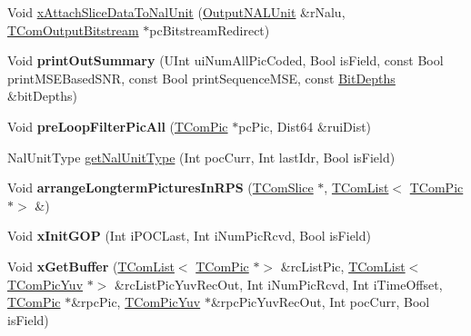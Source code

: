 \begin{DoxyCompactItemize}
\item 
Void \hyperlink{class_t_enc_g_o_p_a96ed3d41554e9b79bdb53902f136a28d}{x\+Attach\+Slice\+Data\+To\+Nal\+Unit} (\hyperlink{struct_output_n_a_l_unit}{Output\+N\+A\+L\+Unit} \&r\+Nalu, \hyperlink{class_t_com_output_bitstream}{T\+Com\+Output\+Bitstream} $\ast$pc\+Bitstream\+Redirect)
\item 
\mbox{\label{class_t_enc_g_o_p_a265e9dfc3f9d1f0e1ea66c9838496d2e}} 
Void {\bfseries print\+Out\+Summary} (U\+Int ui\+Num\+All\+Pic\+Coded, Bool is\+Field, const Bool print\+M\+S\+E\+Based\+S\+NR, const Bool print\+Sequence\+M\+SE, const \hyperlink{struct_bit_depths}{Bit\+Depths} \&bit\+Depths)
\item 
\mbox{\label{class_t_enc_g_o_p_a3de238965cb45d2418272b31b9124afc}} 
Void {\bfseries pre\+Loop\+Filter\+Pic\+All} (\hyperlink{class_t_com_pic}{T\+Com\+Pic} $\ast$pc\+Pic, Dist64 \&rui\+Dist)
\item 
Nal\+Unit\+Type \hyperlink{class_t_enc_g_o_p_a7bd2e40d2f134c13ed5db1bdeb3f115b}{get\+Nal\+Unit\+Type} (Int poc\+Curr, Int last\+Idr, Bool is\+Field)
\item 
\mbox{\label{class_t_enc_g_o_p_aa1263589751580350cd2c7722a377f4d}} 
Void {\bfseries arrange\+Longterm\+Pictures\+In\+R\+PS} (\hyperlink{class_t_com_slice}{T\+Com\+Slice} $\ast$, \hyperlink{class_t_com_list}{T\+Com\+List}$<$ \hyperlink{class_t_com_pic}{T\+Com\+Pic} $\ast$$>$ \&)
\item 
\mbox{\label{class_t_enc_g_o_p_aae6bcefeec5b4ce3fc6184e4a7664e2f}} 
Void {\bfseries x\+Init\+G\+OP} (Int i\+P\+O\+C\+Last, Int i\+Num\+Pic\+Rcvd, Bool is\+Field)
\item 
\mbox{\label{class_t_enc_g_o_p_a03b8814c81932aa44e08c6f8ae10a9f3}} 
Void {\bfseries x\+Get\+Buffer} (\hyperlink{class_t_com_list}{T\+Com\+List}$<$ \hyperlink{class_t_com_pic}{T\+Com\+Pic} $\ast$$>$ \&rc\+List\+Pic, \hyperlink{class_t_com_list}{T\+Com\+List}$<$ \hyperlink{class_t_com_pic_yuv}{T\+Com\+Pic\+Yuv} $\ast$$>$ \&rc\+List\+Pic\+Yuv\+Rec\+Out, Int i\+Num\+Pic\+Rcvd, Int i\+Time\+Offset, \hyperlink{class_t_com_pic}{T\+Com\+Pic} $\ast$\&rpc\+Pic, \hyperlink{class_t_com_pic_yuv}{T\+Com\+Pic\+Yuv} $\ast$\&rpc\+Pic\+Yuv\+Rec\+Out, Int poc\+Curr, Bool is\+Field)
\item 
$$
\end{DoxyCompactItemize}
